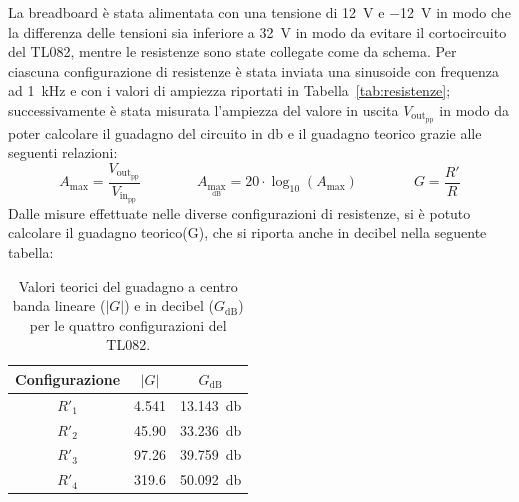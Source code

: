 \documentclass{article}
\begin{document}
La breadboard è stata alimentata con una tensione di \SI{+12}{\volt} e \SI{-12}{\volt} in modo che la differenza delle tensioni sia inferiore a \SI{32}{\volt} in modo da evitare il cortocircuito del TL082, mentre le resistenze sono state collegate come da schema. 
Per ciascuna configurazione di resistenze è stata inviata una sinusoide con frequenza ad \SI{1}{\kilo\hertz} e con i valori di ampiezza riportati in Tabella~\ref{tab:resistenze}; successivamente è stata misurata l'ampiezza del valore in uscita $V_{\text{out}_{\text{pp}}}$ in modo da poter calcolare il guadagno del circuito in \si{\decibel} e il guadagno teorico grazie alle seguenti relazioni:
\begin{equation}
    A_{\max} = \frac{V_{\text{out}_{\text{pp}}}}{V_{\text{in}_{\text{pp}}}} \qquad \qquad A_{\max_{\text{dB}}} = 20 \cdot \log_{10}(A_{\max}) \qquad \qquad G=\frac{R'}{R}
\end{equation}
Dalle misure effettuate nelle diverse configurazioni di resistenze, si è potuto calcolare il guadagno teorico(G), che si riporta anche in decibel nella seguente tabella:
\begin{table}[H]
    \centering
    \caption{Valori teorici del guadagno a centro banda lineare ($|G|$) e in decibel ($G_{\text{dB}}$) per le quattro configurazioni del TL082.}
    \label{tab:guadagno_teorico}
    \begin{tabular}{ccc}
        \toprule
        \textbf{Configurazione} & \textbf{$|G|$} & \textbf{$G_{\text{dB}}$} \\
        \midrule
        $R'_1$ & \num{4.541} & \SI{13.143}{\decibel} \\
        $R'_2$ & \num{45.90} & \SI{33.236}{\decibel} \\
        $R'_3$ & \num{97.26} & \SI{39.759}{\decibel} \\
        $R'_4$ & \num{319.6} & \SI{50.092}{\decibel} \\
        \bottomrule
    \end{tabular}
\end{table}
\end{document}
